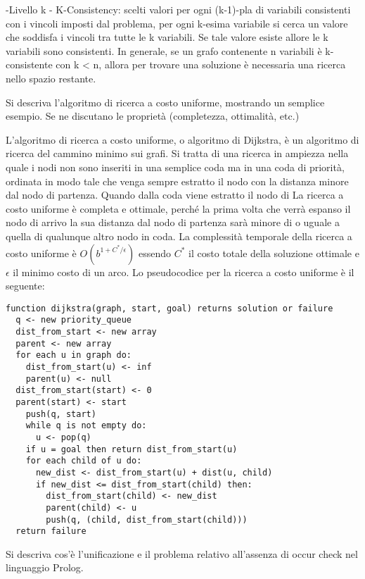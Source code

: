 \documentclass[answers, a4paper, 11pt]{exam}
\begin{document}
\begin{questions}
\begin{solution}
  -Livello k - K-Consistency: scelti valori per ogni (k-1)-pla di variabili consistenti con i vincoli imposti dal problema, per ogni k-esima variabile si cerca un valore che soddisfa i vincoli tra tutte le k variabili. Se tale valore esiste allore le k variabili sono consistenti. In generale, se un grafo contenente n variabili è k-consistente con k < n, allora per trovare una soluzione è necessaria una ricerca nello spazio restante.
\end{solution}

\question Si descriva l’algoritmo di ricerca a costo uniforme, mostrando un semplice esempio. Se ne discutano le
proprietà (completezza, ottimalità, etc.)
\begin{solution}
	L'algoritmo di ricerca a costo uniforme, o algoritmo di Dijkstra, è un algoritmo di ricerca del cammino minimo sui grafi. 
  Si tratta di una ricerca in ampiezza nella quale i nodi non sono inseriti in una semplice coda ma in una coda di priorità, ordinata in modo tale che venga sempre estratto il nodo con la distanza minore dal nodo di partenza. 
  Quando dalla coda viene estratto il nodo di 
  La ricerca a costo uniforme è completa e ottimale, perché la prima volta che verrà espanso il nodo di arrivo la sua distanza dal nodo di partenza sarà minore di o uguale a quella di qualunque altro nodo in coda. 
  La complessità temporale della ricerca a costo uniforme è $O(b^{1 + C^*/\epsilon})$ essendo $C^*$ il costo totale della soluzione ottimale  e $\epsilon$ il minimo costo di un arco. 
	Lo pseudocodice per la ricerca a costo uniforme è il seguente:
	\begin{verbatim}
function dijkstra(graph, start, goal) returns solution or failure
  q <- new priority_queue
  dist_from_start <- new array
  parent <- new array
  for each u in graph do:
    dist_from_start(u) <- inf
    parent(u) <- null
  dist_from_start(start) <- 0
  parent(start) <- start
	push(q, start)
	while q is not empty do:
	  u <- pop(q)
    if u = goal then return dist_from_start(u)
    for each child of u do:
      new_dist <- dist_from_start(u) + dist(u, child) 
      if new_dist <= dist_from_start(child) then:
        dist_from_start(child) <- new_dist
        parent(child) <- u
        push(q, (child, dist_from_start(child)))
  return failure
	\end{verbatim}
\end{solution}
\question Si descriva cos’è l'unificazione e il problema relativo all’assenza di occur check nel linguaggio Prolog.


\end{questions}
\end{document}
